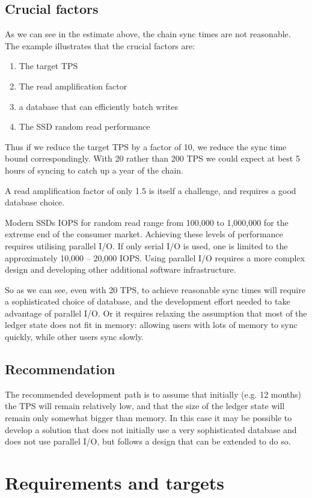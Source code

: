 \documentclass[11pt,a4paper]{article}
\begin{document}
\subsection{Crucial factors}
As we can see in the estimate above, the chain sync times are not reasonable.
The example illustrates that the crucial factors are:
\begin{enumerate}
\item The target TPS
\item The read amplification factor
\item a database that can efficiently batch writes
\item The SSD random read performance
\end{enumerate}
Thus if we reduce the target TPS by a factor of 10, we reduce the sync time bound
correspondingly. With 20 rather than 200 TPS we could expect at best 5 hours of syncing
to catch up a year of the chain.

A read amplification factor of only 1.5 is itself a challenge, and requires a
good database choice.

Modern SSDs IOPS for random read range from 100,000 to 1,000,000 for the
extreme end of the consumer market. Achieving these levels of performance
requires utilising parallel I/O. If only serial I/O is used, one is limited to
the approximately 10,000 -- 20,000 IOPS. Using parallel I/O requires a more
complex design and developing other additional software infrastructure.

So as we can see, even with 20 TPS, to achieve reasonable sync times will
require a sophisticated choice of database, and the development effort needed
to take advantage of parallel I/O. Or it requires relaxing the assumption that
most of the ledger state does not fit in memory: allowing users with lots of
memory to sync quickly, while other users sync slowly.

\subsection{Recommendation}
The recommended development path is to assume that initially (e.g. 12 months)
the TPS will remain relatively low, and that the size of the ledger state will
remain only somewhat bigger than memory. In this case it may be possible to
develop a solution that does not initially use a very sophisticated database
and does not use parallel I/O, but follows a design that can be extended to do
so.

\section{Requirements and targets}
\label{requirements}
\end{document}
